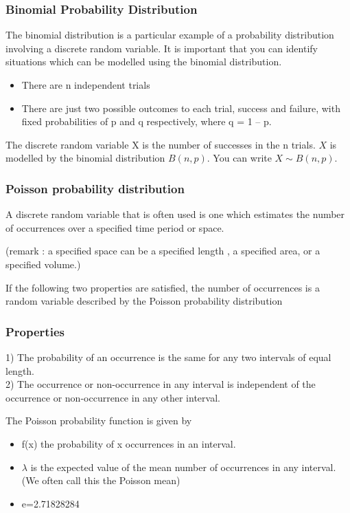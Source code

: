 \documentclass[IntroMain.tex]{subfiles}
\begin{document}
\begin{frame}
	\frametitle{Binomial Probability Distribution}
The binomial distribution is a particular example of a probability distribution involving a discrete random variable. 
It is important that you can identify situations which can be modelled using the binomial distribution. 
\begin{itemize}
\item There are n independent trials 
\item There are just two possible outcomes to each trial, success and failure, with fixed probabilities of p and q respectively, where q = 1 – p. 
\end{itemize}

The discrete random variable X is the number of successes in the n trials. 
$X$ is modelled by the binomial distribution $B(n,p)$. You can write $X \sim B(n, p)$.
\end{frame}
\begin{frame}
	\frametitle{Poisson probability distribution}

A discrete random variable that is often used is one which estimates the number of occurrences  over a specified time period or space.

(remark : a specified space can be a specified length , a specified area, or a specified volume.)

If the following two properties are satisfied, the number of occurrences is a random variable described by the Poisson probability distribution

\end{frame}
\begin{frame}
	\frametitle{Properties}
1)      The probability of an occurrence is the same for any two intervals of equal length.\\
2)      The occurrence or non-occurrence in any interval is independent of the occurrence or non-occurrence in any other interval.\\

\end{frame}
\begin{frame}

The Poisson probability function is given by

 
 
\begin{itemize} 
\item	f(x) the probability of x occurrences in an interval. 
\item	$\lambda$ is the expected value of the mean number of occurrences in any interval. (We often call this the Poisson mean)
\item	e=2.71828284
\end{itemize} 

\end{frame}
\end{document}

